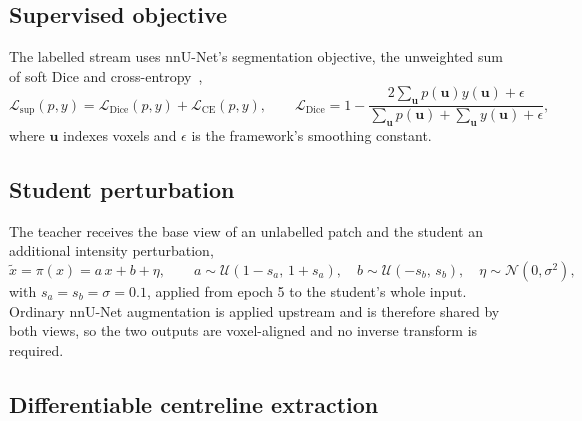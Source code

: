 \subsection{Supervised objective}

The labelled stream uses nnU-Net's segmentation objective, the unweighted sum of soft Dice and
cross-entropy~\cite{isensee2021nnunet},
\begin{equation}
  \mathcal{L}_{\mathrm{sup}}(p,y)=\mathcal{L}_{\mathrm{Dice}}(p,y)+\mathcal{L}_{\mathrm{CE}}(p,y),
  \qquad
  \mathcal{L}_{\mathrm{Dice}}=1-\frac{2\sum_{\mathbf{u}}p(\mathbf{u})y(\mathbf{u})+\epsilon}
          {\sum_{\mathbf{u}}p(\mathbf{u})+\sum_{\mathbf{u}}y(\mathbf{u})+\epsilon},
  \label{eq:lsup}
\end{equation}
where $\mathbf{u}$ indexes voxels and $\epsilon$ is the framework's smoothing constant.

\subsection{Student perturbation}

The teacher receives the base view of an unlabelled patch and the student an additional
intensity perturbation,
\begin{equation}
  \tilde{x}=\pi(x)=a\,x+b+\eta,
  \qquad
  a\sim\mathcal{U}(1-s_a,\,1+s_a),
  \quad
  b\sim\mathcal{U}(-s_b,\,s_b),
  \quad
  \eta\sim\mathcal{N}(0,\sigma^2),
  \label{eq:perturbation}
\end{equation}
with $s_a=s_b=\sigma=0.1$, applied from epoch 5 to the student's whole input. Ordinary nnU-Net
augmentation is applied upstream and is therefore shared by both views, so the two outputs are
voxel-aligned and no inverse transform is required.

\subsection{Differentiable centreline extraction}

